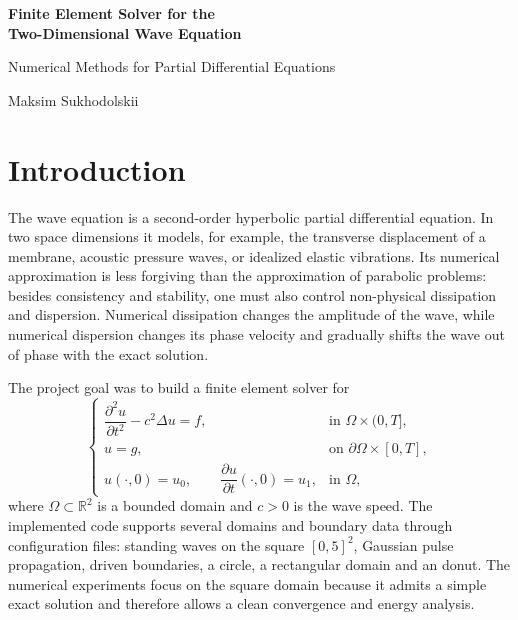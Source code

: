 \documentclass[11pt,a4paper]{article}
\newcommand{\R}{\mathbb{R}}
\begin{document}
\begin{titlepage}
\thispagestyle{empty}
\vspace*{\fill}
\begin{center}
{\LARGE\bfseries Finite Element Solver for the\\[0.25em]
Two-Dimensional Wave Equation\par}
\vspace{1.2em}
{\large Numerical Methods for Partial Differential Equations\par}
\vspace{3.5em}
{\large Maksim Sukhodolskii\par}
\end{center}
\vspace*{\fill}
\end{titlepage}

\tableofcontents
\clearpage

\section{Introduction}

The wave equation is a second-order hyperbolic partial
differential equation.  In two space dimensions it models, for example, the
transverse displacement of a membrane, acoustic pressure waves, or idealized
elastic vibrations.  Its numerical approximation is less forgiving than the
approximation of parabolic problems: besides consistency and stability, one
must also control non-physical dissipation and dispersion.  Numerical
dissipation changes the amplitude of the wave, while numerical dispersion
changes its phase velocity and gradually shifts the wave out of phase with the
exact solution.

The project goal was to build a finite element solver for
\begin{equation}
\begin{cases}
\dfrac{\partial^2 u}{\partial t^2} - c^2 \Delta u = f, & \text{in } \Omega \times (0,T],\\
u = g, & \text{on } \partial\Omega \times [0,T],\\
u(\cdot,0)=u_0,\qquad \dfrac{\partial u}{\partial t}(\cdot,0)=u_1, & \text{in } \Omega,
\end{cases}
\label{eq:strong}
\end{equation}
where $\Omega\subset\R^2$ is a bounded domain and $c>0$ is the wave speed.  The
implemented code supports several domains and boundary data through
configuration files: standing waves on the square $[0,5]^2$, Gaussian pulse
propagation, driven boundaries, a circle, a rectangular domain and an donut.
The numerical experiments focus on the square domain because it admits a simple
exact solution and therefore allows a clean convergence and energy analysis.
\end{document}
